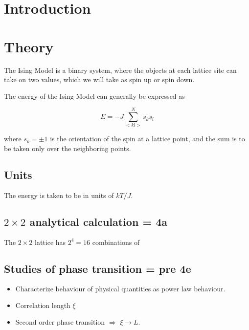 \documentclass[10pt]{article}
\begin{document}
\newpage



\begin{multicols}{2}
\tableofcontents

{}

\section{Introduction}

\section{Theory}
The Ising Model is a binary system, where the objects at each lattice site
can take on two values, which we will take as spin up or spin down.

The energy of the Ising Model can generally be expressed as

\begin{equation}
    E = -J \sum_{<kl>}^N s_k s_l
\end{equation}

where $s_k = \pm 1$ is the orientation of the spin at a lattice point, and
the sum is to be taken only over the neighboring points.

\subsection{Units}
The energy is taken to be in units of $kT/J$.

\subsection{$2\times 2$ analytical calculation = 4a} 
\label{sub:2x2latticetheory}

The $2 \times 2$ lattice has $2^4 = 16$ combinations of 


\subsection{Studies of phase transition = pre 4e} 
\begin{itemize}
    \item Characterize behaviour of physical quantities as power law
        behaviour. 
    \item Correlation length $\xi$
    \item Second order phase transition $\Rightarrow$ $\xi \to L$.
\end{itemize}


\end{multicols}
\end{document}
